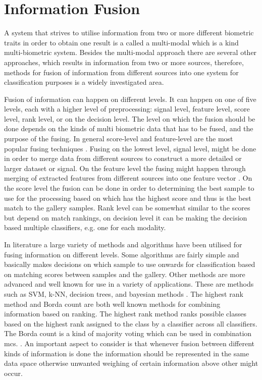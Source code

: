 \section{Information Fusion}

A system that strives to utilise information from two or more different biometric traits in order to obtain one result is a called a multi-modal which is a kind multi-biometric system. Besides the multi-modal approach there are several other approaches, which results in information from two or more sources, therefore, methods for fusion of information from different sources into one system for classification purposes is a widely investigated area. \citep{Bowyer2016b} 

Fusion of information can happen on different levels. It can happen on one of five levels, each with a higher level of preprocessing: signal level, feature level, score level, rank level, or on the decision level. The level on which the fusion should be done depends on the kinds of multi biometric data that has to be fused, and the purpose of the fusing. In general score-level and feature-level are the most popular fusing techniques \citep{Bowyer2016b}. Fusing on the lowest level, signal level, might be done in order to merge data from different sources to construct a more detailed or larger dataset or signal. On the feature level the fusing might happen through merging of extracted features from different sources into one feature vector \citep{Ross2003}. On the score level the fusion can be done in order to determining the best sample to use for the processing based on which has the highest score and thus is the best match to the gallery samples. Rank level can be somewhat similar to the scores but depend on match rankings, on decision level it can be making the decision based multiple classifiers, e.g. one for each modality\citep{Fierrez2018b}.

In literature a large variety of methods and algorithms have been utilised for fusing information on different levels. Some algorithms are fairly simple and basically makes decisions on which sample to use onwards for classification based on matching scores between samples and the gallery. Other methods are more advanced and well known for use in a variety of applications. These are methods such as SVM, k-NN, decision trees, and bayesian methods \citep{Ross2003}. The highest rank method and Borda count are both well known methods for combining information based on ranking. The highest rank method ranks possible classes based on the highest rank assigned to the class by a classifier across all classifiers.\citep{Ho1994} The Borda count is a kind of majority voting which can be used in combination \gls{mcs}. \citep{Bowyer2016b,Ho1994}. An important aspect to consider is that whenever fusion between different kinds of information is done the information should be represented in the same data space otherwise unwanted weighing of certain information above other might occur.   

